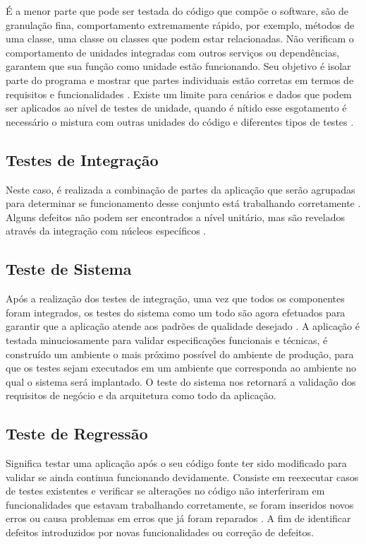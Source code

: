 É a menor parte que pode ser testada do código que compõe o software, são de granulação fina, comportamento extremamente rápido, por exemplo, métodos de uma classe, uma classe ou classes que podem estar relacionadas. Não verificam o comportamento de unidades integradas com outros serviços ou dependências, garantem que sua função como unidade estão funcionando. Seu objetivo é isolar parte do programa e mostrar que partes individuais estão corretas em termos de requisitos e funcionalidades \cite{James2012}.  Existe um limite para cenários e dados que podem ser aplicados ao nível de testes de unidade, quando é nítido esse esgotamento é necessário o mistura com outras unidades do código e diferentes tipos de testes \cite{tutorialsPoint}.

\subsection{Testes de Integração}

Neste caso, é realizada a combinação de partes da aplicação que serão agrupadas para determinar se funcionamento desse conjunto está trabalhando corretamente \cite{tutorialsPoint}. Alguns defeitos não podem ser encontrados a nível unitário, mas são revelados através da integração com núcleos específicos \cite{Pachawan2014}. 

\subsection{Teste de Sistema}

Após a realização dos testes de integração, uma vez que todos os componentes foram integrados, os testes do sistema como um todo são agora efetuados para garantir que a aplicação atende aos padrões de qualidade desejado \cite{tutorialsPoint}. A aplicação é testada minuciosamente para validar especificações funcionais e técnicas, é construído um ambiente o mais próximo possível do ambiente de produção, para que os testes sejam executados em um ambiente que corresponda ao ambiente no qual o sistema será implantado. O teste do sistema nos retornará a validação dos requisitos de negócio e da arquitetura como todo da aplicação.

\subsection{Teste de Regressão}

Significa testar uma aplicação após o seu código fonte ter sido modificado para validar se ainda continua funcionando devidamente. Consiste em reexecutar casos de testes existentes e verificar se alterações no código não interferiram em funcionalidades que estavam trabalhando corretamente, se foram inseridos novos erros ou causa problemas em erros que já foram reparados \cite{Leung1990}. A fim de identificar defeitos introduzidos por novas funcionalidades ou correção de defeitos.

